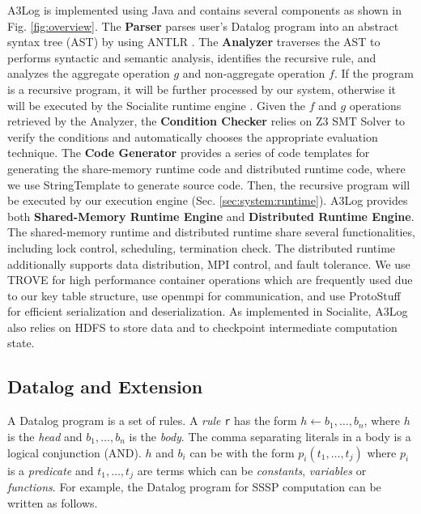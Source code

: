 A3Log is implemented using Java and contains several components as shown in Fig. \ref{fig:overview}. The \textbf{Parser} parses user's Datalog program into an abstract syntax tree (AST) by using ANTLR \cite{antlr}. The \textbf{Analyzer} traverses the AST to performs syntactic and semantic analysis, identifies the recursive rule, and analyzes the aggregate operation $g$ and non-aggregate operation $f$. If the program is a recursive program, it will be further processed by our system, otherwise it will be executed by the Socialite runtime engine \cite{Lam:2013:SDE:2510649.2511289,Seo:2013:DSD:2556549.2556572}. Given the $f$ and $g$ operations retrieved by the Analyzer, the \textbf{Condition Checker} relies on Z3 SMT Solver \cite{DeMoura:2008:ZES:1792734.1792766,z3} to verify the conditions and automatically chooses the appropriate evaluation technique. The \textbf{Code Generator} provides a series of code templates for generating the share-memory runtime code and distributed runtime code, where we use StringTemplate \cite{stringtemplate} to generate source code. Then, the recursive program will be executed by our execution engine (Sec. \ref{sec:system:runtime}). A3Log provides both \textbf{Shared-Memory Runtime Engine} and \textbf{Distributed Runtime Engine}. The shared-memory runtime and distributed runtime share several functionalities, including lock control, scheduling, termination check. The distributed runtime additionally supports data distribution, MPI control, and fault tolerance. We use TROVE \cite{trove} for high performance container operations which are frequently used due to our key table structure, use openmpi \cite{mpich} for  communication, and use ProtoStuff \cite{Protostuff} for efficient serialization and deserialization. As implemented in Socialite, A3Log also relies on HDFS to store data and to checkpoint intermediate computation state.

\subsection{Datalog and Extension}
\label{sec:system:datalog}

A Datalog program is a set of rules. A \emph{rule} \texttt{r} has the form $h\leftarrow b_1,\ldots,b_n$, where $h$ is the \emph{head} and $b_1,\ldots,b_n$ is the \emph{body}. The comma separating literals in a body is a logical conjunction (AND). $h$ and $b_i$ can be with the form $p_i(t_1,\ldots,t_j)$ where $p_i$ is a \emph{predicate} and $t_1,\ldots,t_j$ are terms which can be \emph{constants}, \emph{variables} or \emph{functions}. For example, the Datalog program for SSSP computation can be written as follows.

